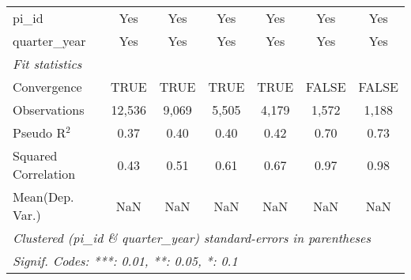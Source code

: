 \begin{tabular}{lcccccc}
   pi\_id                                                     & Yes          & Yes           & Yes           & Yes           & Yes           & Yes\\  
   quarter\_year                                              & Yes          & Yes           & Yes           & Yes           & Yes           & Yes\\  
   \midrule
   \emph{Fit statistics}\\
   Convergence                                                &TRUE          & TRUE          & TRUE          & TRUE          & FALSE         & FALSE\\  
   Observations                                               & 12,536       & 9,069         & 5,505         & 4,179         & 1,572         & 1,188\\  
   Pseudo R$^2$                                               & 0.37         & 0.40          & 0.40          & 0.42          & 0.70          & 0.73\\  
   Squared Correlation                                        & 0.43         & 0.51          & 0.61          & 0.67          & 0.97          & 0.98\\  
Mean(Dep. Var.) & NaN & NaN & NaN & NaN & NaN & NaN \\
   \midrule \midrule
   \multicolumn{7}{l}{\emph{Clustered (pi\_id \& quarter\_year) standard-errors in parentheses}}\\
   \multicolumn{7}{l}{\emph{Signif. Codes: ***: 0.01, **: 0.05, *: 0.1}}\\
\end{tabular}
\par\endgroup
